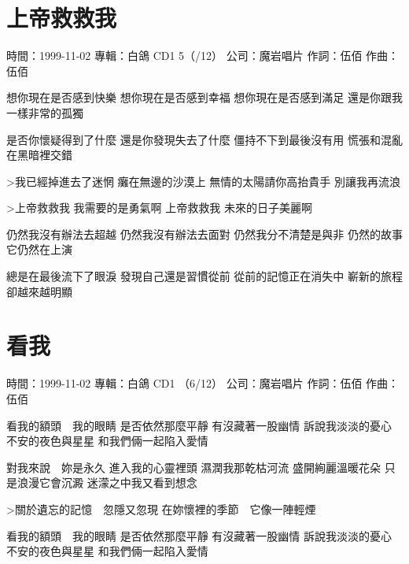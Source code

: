 \documentclass[UTF8,a4paper,oneside,twocolumn,12pt]{ctexbook}
\newcommand{\infopair}[2]{\textbullet #1：#2}
\newcommand{\zc}[1][伍佰]{\infopair{作詞}{#1}}
\newcommand{\zq}[1][伍佰]{\infopair{作曲}{#1}}
\newcommand{\zj}[1]{\infopair{專輯}{#1}}
\newcommand{\sj}[1]{\infopair{時間}{#1}}
\newcommand{\gs}[1]{\infopair{公司}{#1}}
\newenvironment{info}{\begin{flushleft}\kaishu
	}
	{\end{flushleft}\normalsize\yahei\par}
\newenvironment{lyric}{
	}
{}
\begin{document}
\section{上帝救救我}
\begin{info}
	\sj{1999-11-02}
	\zj{白鴿 CD1 5（/12）}
	\gs{魔岩唱片}
	\zc
	\zq
\end{info}
\begin{lyric}
	想你現在是否感到快樂
	想你現在是否感到幸福
	想你現在是否感到滿足
	還是你跟我一樣非常的孤獨

	是否你懷疑得到了什麼
	還是你發現失去了什麼
	僵持不下到最後沒有用
	慌張和混亂在黑暗裡交錯

	>我已經掉進去了迷惘
	癱在無邊的沙漠上
	無情的太陽請你高抬貴手
	別讓我再流浪

	>上帝救救我
	我需要的是勇氣啊
	上帝救救我
	未來的日子美麗啊

	仍然我沒有辦法去超越
	仍然我沒有辦法去面對
	仍然我分不清楚是與非
	仍然的故事它仍然在上演

	總是在最後流下了眼淚
	發現自己還是習慣從前
	從前的記憶正在消失中
	嶄新的旅程卻越來越明顯
\end{lyric}

\section{看我}
\begin{info}
	\sj{1999-11-02}
	\zj{白鴿 CD1 （6/12）}
	\gs{魔岩唱片}
	\zc
	\zq
\end{info}
\begin{lyric}
	看我的額頭　我的眼睛
	是否依然那麼平靜
	有沒藏著一股幽情
	訴說我淡淡的憂心
	不安的夜色與星星
	和我們倆一起陷入愛情

	對我來說　妳是永久
	進入我的心靈裡頭
	濕潤我那乾枯河流
	盛開絢麗溫暖花朵
	只是浪漫它會沉澱
	迷濛之中我又看到想念

	>關於遺忘的記憶　忽隱又忽現
	在妳懷裡的季節　它像一陣輕煙

	看我的額頭　我的眼睛
	是否依然那麼平靜
	有沒藏著一股幽情
	訴說我淡淡的憂心
	不安的夜色與星星
	和我們倆一起陷入愛情
\end{lyric}
\end{document}
